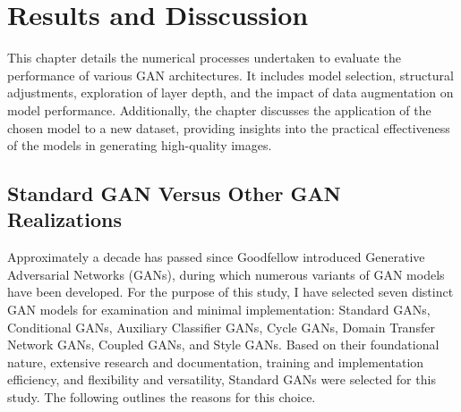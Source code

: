 \chapter{Results and Disscussion}
\label{Experiments}

This chapter details the numerical processes undertaken to evaluate the performance of various GAN 
architectures. It includes model selection, structural adjustments, exploration of layer depth, and the 
impact of data augmentation on model performance. Additionally, the chapter discusses the application of 
the chosen model to a new dataset, providing insights into the practical effectiveness of the models 
in generating high-quality images. 


\section{Standard GAN Versus Other GAN Realizations}
Approximately a decade has passed since Goodfellow introduced Generative Adversarial Networks (GANs), 
during which numerous variants of GAN models have been developed. For the purpose of this study, 
I have selected seven distinct GAN models for examination and minimal implementation: Standard GANs, 
Conditional GANs, Auxiliary Classifier GANs, Cycle GANs, Domain Transfer Network GANs, Coupled GANs, 
and Style GANs. Based on their foundational nature, extensive research and documentation, training and 
implementation efficiency, and flexibility and versatility, Standard GANs were selected for this study. 
The following outlines the reasons for this choice.


